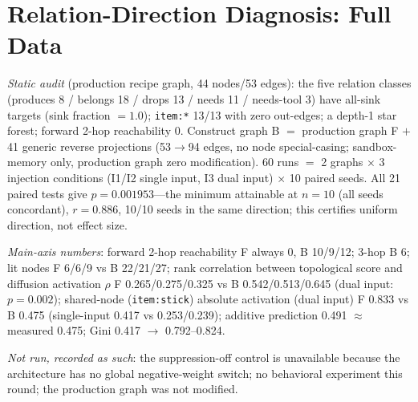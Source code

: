 \documentclass[10pt,a4paper]{article}
\begin{document}
\section{Relation-Direction Diagnosis: Full Data}
\label{s9:reldir}

\emph{Static audit} (production recipe graph, 44 nodes/53 edges): the five relation classes (produces 8 / belongs 18 / drops 13 / needs 11 / needs-tool 3) have all-sink targets (sink fraction $=1.0$); \texttt{item:*} 13/13 with zero out-edges; a depth-1 star forest; forward 2-hop reachability 0. Construct graph B $=$ production graph F $+$ 41 generic reverse projections (53$\rightarrow$94 edges, no node special-casing; sandbox-memory only, production graph zero modification). 60 runs $=$ 2 graphs $\times$ 3 injection conditions (I1/I2 single input, I3 dual input) $\times$ 10 paired seeds. All 21 paired tests give $p{=}0.001953$---the minimum attainable at $n{=}10$ (all seeds concordant), $r{=}0.886$, 10/10 seeds in the same direction; this certifies uniform direction, not effect size.

\emph{Main-axis numbers}: forward 2-hop reachability F always 0, B 10/9/12; 3-hop B 6; lit nodes F 6/6/9 vs B 22/21/27; rank correlation between topological score and diffusion activation $\rho$ F 0.265/0.275/0.325 vs B 0.542/0.513/0.645 (dual input: $p{=}0.002$); shared-node (\texttt{item:stick}) absolute activation (dual input) F 0.833 vs B 0.475 (single-input 0.417 vs 0.253/0.239); additive prediction 0.491 $\approx$ measured 0.475; Gini 0.417 $\rightarrow$ 0.792--0.824.

\emph{Not run, recorded as such}: the suppression-off control is unavailable because the architecture has no global negative-weight switch; no behavioral experiment this round; the production graph was not modified.
\end{document}

